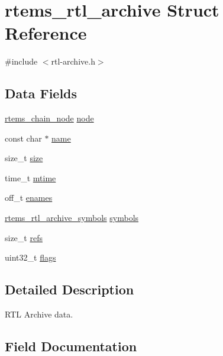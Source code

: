 \hypertarget{structrtems__rtl__archive}{}\section{rtems\+\_\+rtl\+\_\+archive Struct Reference}
\label{structrtems__rtl__archive}


{\ttfamily \#include $<$rtl-\/archive.\+h$>$}

\subsection*{Data Fields}
\begin{DoxyCompactItemize}
\item 
\mbox{\hyperlink{structChain__Node__struct}{rtems\+\_\+chain\+\_\+node}} \mbox{\hyperlink{structrtems__rtl__archive_a5d48b5925d3decf8e47ddcdaf4ebd173}{node}}
\item 
const char $\ast$ \mbox{\hyperlink{structrtems__rtl__archive_a7936b084cb92c8df23a4cac1e1c2692d}{name}}
\item 
size\+\_\+t \mbox{\hyperlink{structrtems__rtl__archive_a891e810ec73a179888d2daf9b74f2c25}{size}}
\item 
time\+\_\+t \mbox{\hyperlink{structrtems__rtl__archive_a6291d9e8a3d47074893baaa3936ff4f7}{mtime}}
\item 
off\+\_\+t \mbox{\hyperlink{structrtems__rtl__archive_af6025871c0a37d135afa2299800418b9}{enames}}
\item 
\mbox{\hyperlink{structrtems__rtl__archive__symbols}{rtems\+\_\+rtl\+\_\+archive\+\_\+symbols}} \mbox{\hyperlink{structrtems__rtl__archive_a68ca1d76c92d0abb213ed252f8bf8c7e}{symbols}}
\item 
size\+\_\+t \mbox{\hyperlink{structrtems__rtl__archive_a84159a50b185bd0a06154e1a0a1cd83a}{refs}}
\item 
uint32\+\_\+t \mbox{\hyperlink{structrtems__rtl__archive_a6abd4c4118933f80e476acb52e856607}{flags}}
\end{DoxyCompactItemize}


\subsection{Detailed Description}
R\+TL Archive data. 

\subsection{Field Documentation}
\mbox{\label{structrtems__rtl__archive_af6025871c0a37d135afa2299800418b9}} 
